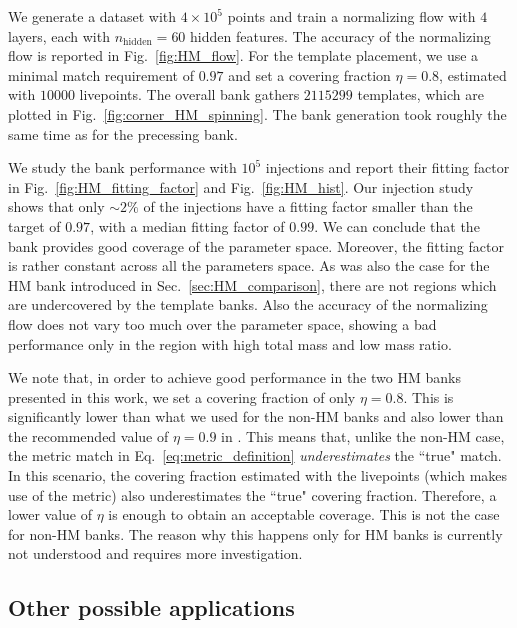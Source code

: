 \documentclass[twocolumn,showpacs,preprintnumbers,nofootinbib,prd,
superscriptaddress,10pt]{revtex4-2}
\begin{document}
We generate a dataset with $4\times 10^5$ points and train a normalizing flow with $4$ layers, each with $n_\text{hidden} = 60$ hidden features. The accuracy of the normalizing flow is reported in Fig.~\ref{fig:HM_flow}.
For the template placement, we use a minimal match requirement of $0.97$ and set a covering fraction $\eta = 0.8$, estimated with $10000$ livepoints.
The overall bank gathers $2115299$ templates, which are plotted in Fig.~\ref{fig:corner_HM_spinning}.
The bank generation took roughly the same time as for the precessing bank.

We study the bank performance with $10^5$ injections and report their fitting factor in Fig.~\ref{fig:HM_fitting_factor} and Fig.~\ref{fig:HM_hist}.
Our injection study shows that only $\sim 2\%$ of the injections have a fitting factor smaller than the target of $0.97$, with a median fitting factor of $0.99$. We can conclude that the bank provides good coverage of the parameter space.
Moreover, the fitting factor is rather constant across all the parameters space. As was also the case for the HM bank introduced in Sec.~\ref{sec:HM_comparison}, there are not regions which are undercovered by the template banks.
Also the accuracy of the normalizing flow does not vary too much over the parameter space, showing a bad performance only in the region with high total mass and low mass ratio.

We note that, in order to achieve good performance in the two HM banks presented in this work, we set a covering fraction of only $\eta = 0.8$. This is significantly lower than what we used for the non-HM banks and also lower than the recommended value of $\eta = 0.9$ in \cite{Coogan:2022qxs}.
This means that, unlike the non-HM case, the metric match in Eq.~\ref{eq:metric_definition} {\it underestimates} the ``true" match. In this scenario, the covering fraction estimated with the livepoints (which makes use of the metric) also underestimates the ``true" covering fraction. Therefore, a lower value of $\eta$ is enough to obtain an acceptable coverage. This is not the case for non-HM banks.
The reason why this happens only for HM banks is currently not understood and requires more investigation.

\subsection{Other possible applications} \label{sec:other_applications}
\end{document}
